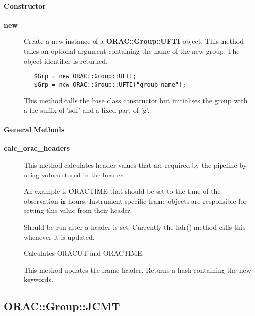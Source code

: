 \paragraph*{Constructor\label{ORAC::Group::UFTI_Constructor}}\begin{description}
\item[\textbf{new}] \mbox{}

Create a new instance of a \textbf{ORAC::Group::UFTI} object.
This method takes an optional argument containing the
name of the new group. The object identifier is returned.

\begin{verbatim}
   $Grp = new ORAC::Group::UFTI;
   $Grp = new ORAC::Group::UFTI("group_name");
\end{verbatim}


This method calls the base class constructor but initialises
the group with a file suffix of '.sdf' and a fixed part
of 'g'.

\end{description}
\paragraph*{General Methods\label{ORAC::Group::UFTI_General_Methods}}\begin{description}
\item[\textbf{calc\_orac\_headers}] \mbox{}

This method calculates header values that are required by the
pipeline by using values stored in the header.



An example is ORACTIME that should be set to the time of the
observation in hours. Instrument specific frame objects
are responsible for setting this value from their header.



Should be run after a header is set. Currently the hdr()
method calls this whenever it is updated.



Calculates ORACUT and ORACTIME



This method updates the frame header.
Returns a hash containing the new keywords.

\end{description}


\subsection{ORAC::Group::JCMT\label{ORAC::Group::JCMT}}

